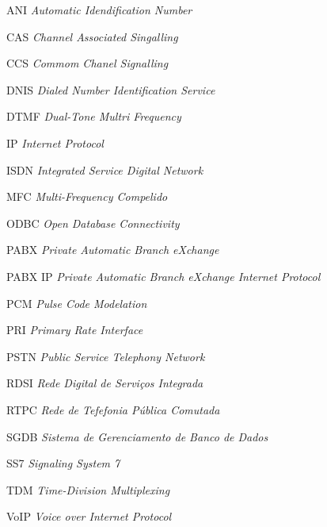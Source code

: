 \documentclass[12pt,openright,oneside,a4paper,brazil]{abntex2}
\begin{document}

\frenchspacing 






%

\listoffigures*
\cleardoublepage





\begin{siglas}
  \item[ANI]	 \textit{Automatic Idendification Number}
  \item[CAS]	 \textit{Channel Associated Singalling}
  \item[CCS]	 \textit{Commom Chanel Signalling}
  \item[DNIS]	 \textit{Dialed Number Identification Service}
  \item[DTMF]	 \textit{Dual-Tone Multri Frequency}
  \item[IP]		 \textit{Internet Protocol}
  \item[ISDN]	 \textit{Integrated Service Digital Network}
  \item[MFC]	 \textit{Multi-Frequency Compelido}
  \item[ODBC]	 \textit{Open Database Connectivity}
  \item[PABX]	 \textit{Private Automatic Branch eXchange}
  \item[PABX IP] \textit{Private Automatic Branch eXchange Internet Protocol}
  \item[PCM]	 \textit{Pulse Code Modelation}
  \item[PRI]	 \textit{Primary Rate Interface}
  \item[PSTN]	 \textit{Public Service Telephony Network}
  \item[RDSI]	 \textit{Rede Digital de Serviços Integrada}
  \item[RTPC]	 \textit{Rede de Tefefonia Pública Comutada}
  \item[SGDB]	 \textit{Sistema de Gerenciamento de Banco de Dados}
  \item[SS7]	 \textit{Signaling System 7}
  \item[TDM]	 \textit{Time-Division Multiplexing}
  \item[VoIP]	 \textit{Voice over Internet Protocol}
\end{siglas}
\end{document}
